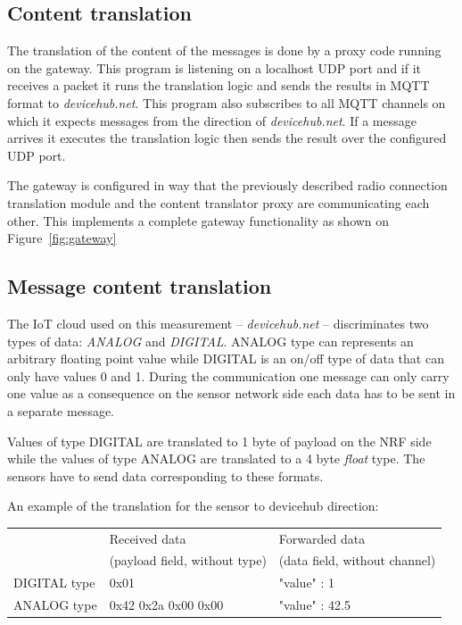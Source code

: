 \documentclass[a4paper]{article}
\begin{document}
\subsection{Content translation}

The translation of the content of the messages is done by a proxy code running on the gateway.
This program is listening on a localhost UDP port and if it receives a packet it runs the
translation logic and sends the results in MQTT format to \emph{devicehub.net}. This program
also subscribes to all MQTT channels on which it expects messages from the direction of \emph{devicehub.net}.
If a message arrives it executes the translation logic then sends the result over the 
configured UDP port.

The gateway is configured in way that the previously described radio connection translation 
module and the content translator proxy are communicating each other. This implements a complete
gateway functionality as shown on Figure~\ref{fig:gateway}

\subsection{Message content translation}

The IoT cloud used on this measurement -- \emph{devicehub.net} -- discriminates two types of 
data: \emph{ANALOG} and \emph{DIGITAL}. ANALOG type can represents an arbitrary floating point
value while DIGITAL is an on/off type of data that can only have values 0 and 1.
During the communication one message can only carry one value as a consequence on the sensor
network side each data has to be sent in a separate message.

Values of type DIGITAL are translated to 1 byte of payload on the NRF side while the values
of type ANALOG are translated to a 4 byte \emph{float} type. The sensors have to send data
corresponding to these formats.

An example of the translation for the sensor to devicehub direction:


\begin{tabular}{|l|l|l|}
\hline
 & Received data  & Forwarded data  \\
 & (payload field, without type) & (data field, without channel) \\
 \hline
DIGITAL type & 0x01 & {"value" : 1} \\
\hline
ANALOG type & 0x42 0x2a 0x00 0x00 & {"value" : 42.5} \\
\hline
\end{tabular}
\end{document}
